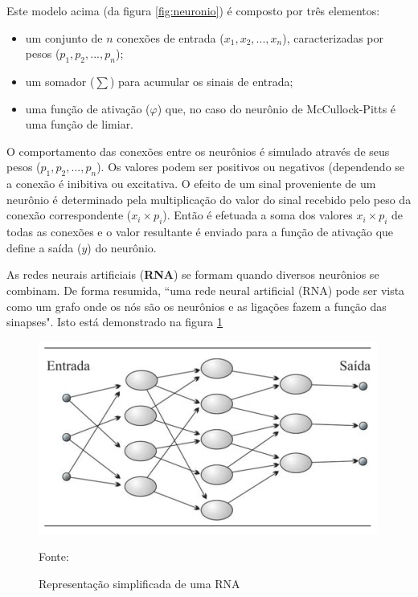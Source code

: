 Este modelo acima (da figura \ref{fig:neuronio}) é composto por três elementos:

\begin{itemize}
	\item  um conjunto de $ n $ conexões de entrada ($ x_1, x_2, ... , x_n $), caracterizadas por pesos ($ p_1, p_2, ..., p_n $);
	\item um somador ($ \sum $) para acumular os sinais de entrada;
	\item uma função de ativação ($\varphi$) que, no caso do neurônio de McCullock-Pitts \cite{mcculloch_logical_1943} é uma função de limiar. \cite{ferneda_redes_2006} \cite{lima_ia_2016}
\end{itemize}

O comportamento das conexões entre os neurônios é simulado através de seus pesos  ($ p_1, p_2, ..., p_n $). Os valores podem ser positivos ou negativos (dependendo se a conexão é inibitiva ou excitativa. O efeito de um sinal proveniente de um neurônio é determinado pela multiplicação do valor do sinal recebido pelo peso da conexão correspondente ($x_i \times p_i$). Então é efetuada a soma dos valores $x_i \times p_i$ de todas as conexões e o valor resultante é enviado para a função de ativação que define a saída ($y$) do neurônio.\cite{Norvig2013}\cite{mcculloch_logical_1943}\cite{minsky_perceptrons:_1969}\cite{ferneda_redes_2006}\cite{haykin_redes_2001}

As redes neurais artificiais (\textbf{RNA}) se formam quando diversos neurônios se combinam. De forma resumida, ``uma rede neural artificial (RNA) pode ser vista como um grafo onde os nós são os neurônios e as ligações fazem a função das sinapses". Isto está demonstrado na figura \ref{fig:rna}

\begin{figure}[h!]
	\centering
	\includegraphics[width=.7\textwidth]{imagens/RNA.png}	
	\caption{Representação simplificada de uma RNA}
	{\scriptsize 	Fonte: \cite[p.26]{ferneda_redes_2006}}
	\label{fig:rna}
\end{figure}


